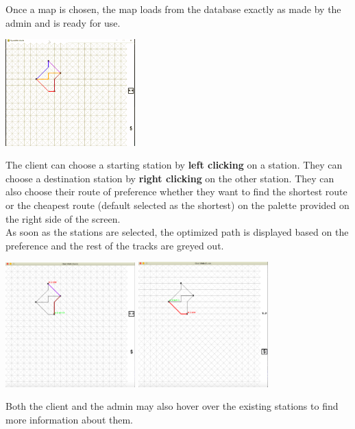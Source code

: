 \documentclass[fontsize=11pt]{article}
\begin{document}
    Once a map is chosen, the map loads from the database exactly as made by the admin and is ready for use.\\
    \begin{center}
        \includegraphics[width = 5cm]{client sample map.png}\\
    \end{center}
    The client can choose a starting station by \textbf{left clicking} on a station. They can choose a destination station by \textbf{right clicking} on the other station. They can also choose their route of preference whether they want to find the shortest route or the cheapest route (default selected as the shortest) on the palette provided on the right side of the screen.\\
    As soon as the stations are selected, the optimized path is displayed based on the preference and the rest of the tracks are greyed out.\\
    \begin{center}
        \includegraphics[width = 5cm]{client shortest route.png} \quad
        \includegraphics[width = 5cm]{client cheapest route.png}
    \end{center}
    Both the client and the admin may also hover over the existing stations to find more information about them. \\
\end{document}
